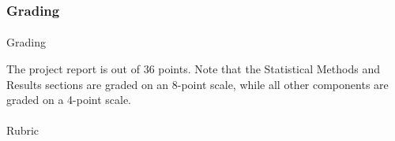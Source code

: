 \documentclass[
  letterpaper,
  DIV=11,
  numbers=noendperiod]{scrartcl}
\makeatletter
\let\oldparagraph\paragraph
\renewcommand{\paragraph}{
    \@ifstar
      \xxxParagraphStar
      \xxxParagraphNoStar
  }
\newcommand{\xxxParagraphStar}[1]{\oldparagraph*{#1}\mbox{}}
\newcommand{\xxxParagraphNoStar}[1]{\oldparagraph{#1}\mbox{}}
\makeatother
\begin{document}
\subsubsection{Grading}\label{grading}

\paragraph{Grading}

The project report is out of 36 points. Note that the Statistical
Methods and Results sections are graded on an 8-point scale, while all
other components are graded on a 4-point scale.

\paragraph{Rubric}
\end{document}
